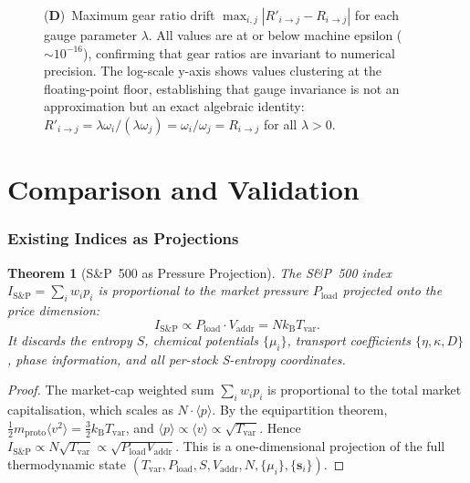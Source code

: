\documentclass[twocolumn,10pt]{article}
\newtheorem{theorem}{Theorem}[section]
\theoremstyle{remark}
\newcommand{\kB}{k_{\mathrm{B}}}
\newcommand{\Tvar}{T_{\mathrm{var}}}
\newcommand{\Pload}{P_{\mathrm{load}}}
\newcommand{\Vaddr}{V_{\mathrm{addr}}}
\newcommand{\mproto}{m_{\mathrm{proto}}}
\begin{document}
\begin{figure}[!htbp]
{    (\textbf{D})~Maximum gear ratio drift $\max_{i,j}|R'_{i \to j} - R_{i \to j}|$ for each gauge parameter $\lambda$.  All values are at or below machine epsilon ($\sim 10^{-16}$), confirming that gear ratios are invariant to numerical precision.  The log-scale y-axis shows values clustering at the floating-point floor, establishing that gauge invariance is not an approximation but an exact algebraic identity: $R'_{i \to j} = \lambda\omega_i/(\lambda\omega_j) = \omega_i/\omega_j = R_{i \to j}$ for all $\lambda > 0$.}
    \label{fig:gauge_invariance}
\end{figure}


\part{Comparison and Validation}

\section{Existing Indices as Projections}
\label{sec:comparison}

\begin{theorem}[S\&P~500 as Pressure Projection]
\label{thm:sp500}
The S\&P~500 index $I_{\mathrm{S\&P}} = \sum_i w_i p_i$ is proportional to the market pressure $\Pload$ projected onto the price dimension:
\begin{equation}
    I_{\mathrm{S\&P}} \propto \Pload \cdot \Vaddr = N\kB\Tvar.
    \label{eq:sp500_projection}
\end{equation}
It discards the entropy $S$, chemical potentials $\{\mu_i\}$, transport coefficients $\{\eta, \kappa, D\}$, phase information, and all per-stock S-entropy coordinates.
\end{theorem}

\begin{proof}
The market-cap weighted sum $\sum_i w_i p_i$ is proportional to the total market capitalisation, which scales as $N \cdot \langle p \rangle$.  By the equipartition theorem, $\frac{1}{2}\mproto\langle v^2 \rangle = \frac{3}{2}\kB\Tvar$, and $\langle p \rangle \propto \langle v \rangle \propto \sqrt{\Tvar}$.  Hence $I_{\mathrm{S\&P}} \propto N\sqrt{\Tvar} \propto \sqrt{\Pload \Vaddr}$.  This is a one-dimensional projection of the full thermodynamic state $(\Tvar, \Pload, S, \Vaddr, N, \{\mu_i\}, \{\mathbf{s}_i\})$.
\end{proof}
\end{document}
